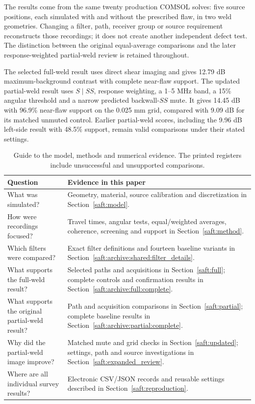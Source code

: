 \documentclass[11pt]{article}
\begin{document}
The results come from the same twenty production COMSOL solves: five source positions, each simulated with and without the prescribed flaw, in two weld geometries. Changing a filter, path, receiver group or source requirement reconstructs those recordings; it does not create another independent defect test. The distinction between the original equal-average comparisons and the later response-weighted partial-weld review is retained throughout.

The selected full-weld result uses direct shear imaging and gives 12.79 dB maximum-background contrast with complete near-flaw support. The updated partial-weld result uses $S\mid SS$, response weighting, a 1--5 MHz band, a 15\% angular threshold and a narrow predicted backwall-$SS$ mute. It gives 14.45 dB with 96.9\% near-flaw support on the 0.025 mm grid, compared with 9.09 dB for its matched unmuted control. Earlier partial-weld scores, including the 9.96 dB left-side result with 48.5\% support, remain valid comparisons under their stated settings.

\begin{table}[!htbp]\centering\small
\caption{Guide to the model, methods and numerical evidence. The printed registers include unsuccessful and unsupported comparisons.}
\begin{tabularx}{\linewidth}{@{}>{\raggedright\arraybackslash}X>{\raggedright\arraybackslash}X@{}}\toprule
Question & Evidence in this paper\\\midrule
What was simulated? & Geometry, material, source calibration and discretization in Section~\ref{saft:model}.\\
How were recordings focused? & Travel times, angular tests, equal/weighted averages, coherence, screening and support in Section~\ref{saft:method}.\\
Which filters were compared? & Exact filter definitions and fourteen baseline variants in Section~\ref{saft:archive:shared:filter_details}.\\
What supports the full-weld result? & Selected paths and acquisitions in Section~\ref{saft:full}; complete controls and confirmation results in Section~\ref{saft:archive:full:complete}.\\
What supports the original partial-weld result? & Path and acquisition comparisons in Section~\ref{saft:partial}; complete baseline results in Section~\ref{saft:archive:partial:complete}.\\
Why did the partial-weld image improve? & Matched mute and grid checks in Section~\ref{saft:updated}; settings, path and source investigations in Section~\ref{saft:expanded_review}.\\
Where are all individual survey results? & Electronic CSV/JSON records and reusable settings described in Section~\ref{saft:reproduction}.\\
\bottomrule\end{tabularx}
\end{table}
\end{document}
